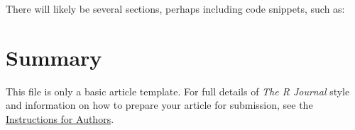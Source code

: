 There will likely be several sections, perhaps including code snippets, such as:


\section{Summary}

This file is only a basic article template. For full details of \emph{The R Journal} style and information on how to prepare your article for submission, see the \href{http://journal.r-project.org/latex/RJauthorguide.pdf}{Instructions for Authors}.


\address{Martijn Tennekes\\
  Statistics Netherlands\\
  CBS-Weg 11, 6412 EX Heerlen\\
  Netherlands\\}


